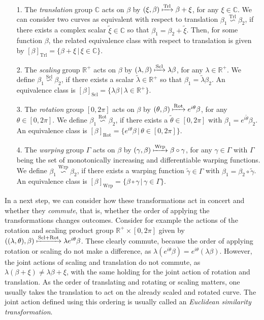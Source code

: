 \begin{itemize}[leftmargin=0.75cm]
  \item[1.] The \emph{translation} group $\mathbb{C}$ acts on $\beta$ by $(\xi, \beta) \xmapsto{\text{Trl}} \beta + \xi$, for any $\xi \in \mathbb{C}$.
    We can consider two curves as equivalent with respect to translation $\beta_1 \overset{\text{Trl}}{\backsim} \beta_2$, if there exists a complex scalar $\widetilde\xi \in \mathbb{C}$ so that $\beta_1 = \beta_2  + \widetilde\xi$.
    Then, for some function $\beta$, the related equivalence class with respect to translation is given by $[\beta]_{\text{Trl}} = \{\beta + \xi\, |\, \xi \in \mathbb{C}\}$.
  \item[2.] The \emph{scaling} group $\mathbb{R}^+$ acts on $\beta$ by $(\lambda, \beta) \xmapsto{\text{Scl}} \lambda \beta$, for any $\lambda \in \mathbb{R}^+$.
    We define $\beta_1 \overset{\text{Scl}}{\backsim} \beta_2$, if there exists a scalar $\widetilde\lambda \in \mathbb{R}^+$ so that $\beta_1 = \widetilde\lambda \beta_2$.
    An equivalence class is $[\beta]_{\text{Scl}} = \{\lambda\beta\,|\, \lambda \in \mathbb{R}^+\}$.
  \item[3.] The \emph{rotation} group $[0,2\pi]$ acts on $\beta$ by $(\theta, \beta) \xmapsto{\text{Rot}}  e^{i\theta} \beta$, for any $\theta \in [0,2\pi]$.
    We define $\beta_1 \overset{\text{Rot}}{\backsim} \beta_2$, if there exists a $\widetilde\theta \in [0,2\pi]$ with $\beta_1 = e^{i\widetilde\theta} \beta_2$.
    An equivalence class is $[\beta]_{\text{Rot}} = \{e^{i\theta}\beta\,|\, \theta \in [0,2\pi]\}$.
  \item[4.] The \emph{warping} group $\Gamma$ acts on $\beta$ by $(\gamma,\beta) \xmapsto{\text{Wrp}} \beta \circ \gamma$, for any $\gamma \in \Gamma$ with $\Gamma$ being the set of monotonically increasing and differentiable warping functions.
    We define $\beta_1 \overset{\text{Wrp}}{\backsim} \beta_2$, if there exists a warping function $\widetilde\gamma \in \Gamma$ with $\beta_1 = \beta_2 \circ \widetilde\gamma$.
    An equivalence class is $[\beta]_{\text{Wrp}} = \{\beta \circ \gamma\,|\, \gamma \in \Gamma\}$.
\end{itemize}

In a next step, we can consider how these transformations act in concert and whether they \textit{commute}, that is, whether the order of applying the transformations changes outcomes.
Consider for example the actions of the rotation and scaling product group $\mathbb{R}^+ \times [0,2\pi]$ given by $((\lambda, \theta), \beta) \xmapsto{\text{Scl} + \text{Rot}} \lambda e^{i\theta} \beta$.
These clearly commute, because the order of applying rotation or scaling do not make a difference, as $\lambda(e^{i\theta}\beta) = e^{i\theta}(\lambda\beta)$.
However, the joint actions of scaling and translation do not commute, as $\lambda(\beta + \xi) \neq \lambda\beta + \xi$, with the same holding for the joint action of rotation and translation.
As the order of translating and rotating or scaling matters, one usually takes the translation to act on the already scaled and rotated curve.
The joint action defined using this ordering is usually called an \textit{Euclidean similarity transformation}.

